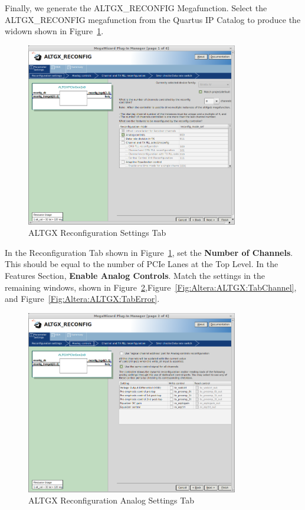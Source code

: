 \documentclass{refrep}
\newcommand{\ConfigSetting}[1]{\textbf{#1}}
\begin{document}
Finally, we generate the ALTGX\_RECONFIG Megafunction. Select the
ALTGX\_RECONFIG megafunction from the Quartus IP Catalog to produce the widown
shown in Figure~\ref{Fig:Altera:ALTGX:TabSettings}.
\begin{figure}[H]
  \includegraphics[width=350px,center]{ALTGXReconfigTabSettings.png}
  \caption{ALTGX Reconfiguration Settings Tab}
  \label{Fig:Altera:ALTGX:TabSettings}
\end{figure}
In the Reconfiguration Tab shown in Figure~\ref{Fig:Altera:ALTGX:TabSettings}, set the \ConfigSetting{Number of Channels}. This should be equal to the number of PCIe Lanes at the Top Level. In the Features Section, \ConfigSetting{Enable Analog Controls}. Match the settings in the remaining windows, shown in Figure~\ref{Fig:Altera:ALTGX:TabInputs},Figure~\ref{Fig:Altera:ALTGX:TabChannel}, and Figure~\ref{Fig:Altera:ALTGX:TabError}.

\begin{figure}[H]
  \includegraphics[width=350px,center]{ALTGXReconfigTabAnalog.png}
  \caption{ALTGX Reconfiguration Analog Settings Tab}
  \label{Fig:Altera:ALTGX:TabInputs}
\end{figure}
\end{document}
